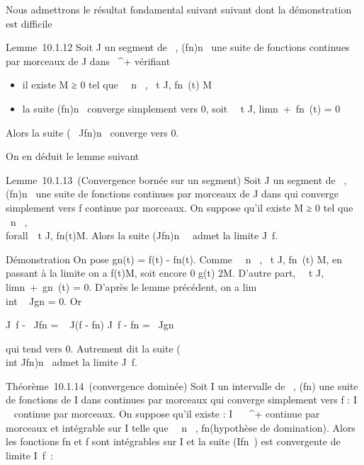 Nous admettrons le résultat fondamental suivant suivant dont la
démonstration est difficile

Lemme~10.1.12 Soit J un segment de ~, (fn)n\in{}~ une
suite de fonctions continues par morceaux de J dans ~^+
vérifiant

\begin{itemize}
\itemsep1pt\parskip0pt
\item
  il existe M ≥ 0 tel que \forall~~n \in {}~,
  \forall~t \in J, fn~(t) \leq M
\item
  la suite (fn)n\in{}~ converge simplement vers 0, soit
  \forall~~t \in J,
  limn\rightarrow~+\infty~fn~(t) = 0
\end{itemize}

Alors la suite (\int ~
Jfn)n\in{}~ converge vers 0.

On en déduit le lemme suivant

Lemme~10.1.13~(Convergence bornée sur un segment) Soit J un segment de
~, (fn)n\in{}~ une suite de fonctions continues par
morceaux de J dans  qui converge simplement vers f continue par
morceaux. On suppose qu'il existe M ≥ 0 tel que
\forall~n \in {}~, \\forall~~t \in J,
\textbar{}fn(t)\textbar{}\leq M. Alors la suite
(\int  Jfn)n\in{}~~
admet la limite \int  J~f.

Démonstration On pose gn(t) = \textbar{}f(t) -
fn(t)\textbar{}. Comme \forall~~n \in {}~,
\forall~t \in J, \textbar{}fn~(t)\textbar{}\leq
M, en passant à la limite on a \textbar{}f(t)\textbar{}\leq M, soit encore
0 \leq g(t) \leq 2M. D'autre part, \forall~~t \in J,
limn\rightarrow~+\infty~gn~(t) = 0. D'après
le lemme précédent, on a
lim\\int ~
Jgn = 0. Or

\left \textbar{}\int  J~f
-\int ~
Jfn\right \textbar{} =
\left \textbar{}\int ~
J(f - fn)\right
\textbar{}\leq\int  J~\textbar{}f -
fn\textbar{} =\int ~
Jgn

qui tend vers 0. Autrement dit la suite (\\int
 Jfn)n\in{}~ admet la limite
\int  J~f.

Théorème~10.1.14~(convergence dominée) Soit I un intervalle de ~,
(fn) une suite de fonctions de I dans  continues par morceaux
qui converge simplement vers f : I \rightarrow~  continue par morceaux. On suppose
qu'il existe \phi : I \rightarrow~ ~^+ continue par morceaux et intégrable
sur I telle que \forall~~n \in {}~,
\textbar{}fn\textbar{}\leq \phi (hypothèse de domination). Alors les
fonctions fn et f sont intégrables sur I et la suite
(\int  Ifn~) est convergente
de limite \int  I~f~:

